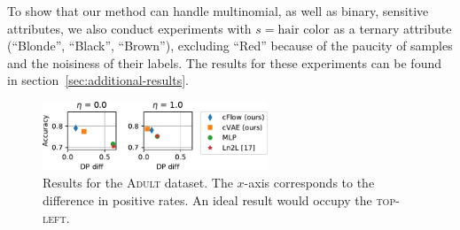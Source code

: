 To show that our method can handle multinomial, as well as binary, sensitive attributes, we also conduct experiments with $s=\textrm{hair color}$ as a ternary attribute (``Blonde'', ``Black'', ``Brown''), excluding ``Red'' because of the paucity of samples and the noisiness of their labels. The results for these experiments can be found in section~\ref{sec:additional-results}.

\begin{figure}[tb]
  \centering
  \includegraphics[width=0.6\textwidth]{./Figures/nosinn_adult_multiplot_mini_diff.pdf}
  \caption{
      Results for the \textsc{Adult} dataset.
      The $x$-axis corresponds to the difference in positive rates.
      An ideal result would occupy the \textsc{top-left}.
  }%
  \label{fig:adult-chart}
\end{figure}

